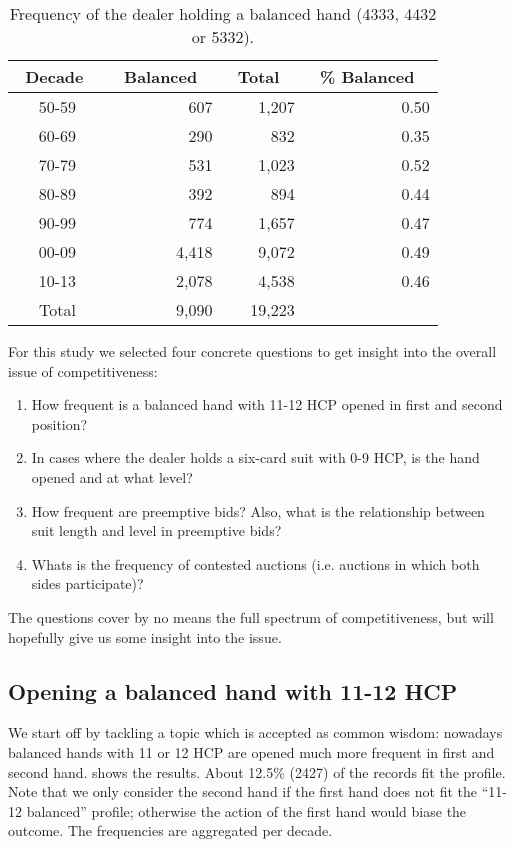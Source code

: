 \documentclass{icga}
\begin{document}
\begin{table}
\centering\footnotesize
\begin{tabular}{|c|r|r|r|}
\hline
\bf \ Decade \ & \bf \ Balanced \ & \bf \ Total \  & \bf \ \% Balanced \ \\ \hline 
50-59 & 607 & 1,207 & 0.50 \\
60-69 & 290 & 832 & 0.35 \\
70-79 & 531 & 1,023 & 0.52 \\
80-89 & 392 & 894 & 0.44 \\
90-99 & 774 & 1,657 & 0.47 \\
00-09 & 4,418 & 9,072 & 0.49 \\
10-13 & 2,078 & 4,538 & 0.46 \\ 
\hline
Total & 9,090 & 19,223 &  \\
\hline
\end{tabular}
\caption{Frequency of the dealer holding a balanced hand (4333, 4432
  or 5332).} 
\label{tbl:balanced-first-hand}
\end{table}

For this study we selected four concrete questions to get insight into
the overall issue of competitiveness:
\begin{enumerate}
\item How frequent is a balanced hand with 11-12 HCP opened in first
  and second position?
\item In cases where the dealer holds a six-card suit with 0-9 HCP, is
  the hand opened and at what level? 
\item How frequent are preemptive bids? Also, what is the relationship
  between suit length and level in preemptive bids? 
\item Whats is the frequency of contested auctions (i.e. auctions in
  which both sides participate)?   
\end{enumerate}

The questions cover by no means the full spectrum of competitiveness,
but will hopefully give us some insight into the issue.   

\subsection{Opening a balanced hand with 11-12 HCP}

We start off by tackling a topic which is accepted as common wisdom:
nowadays balanced hands with 11 or 12 HCP are opened much more
frequent in first and second hand.   shows
the results. About 12.5\% (2427) of the records fit the profile. Note
that we only consider the second hand if the first hand does not fit
the ``11-12 balanced'' profile; otherwise the action of the first hand
would biase the outcome.  The frequencies are aggregated per decade.
\end{document}
